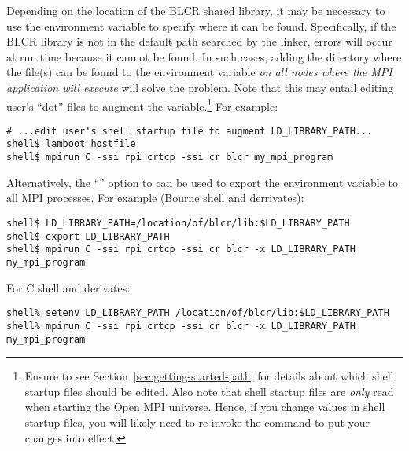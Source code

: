 
Depending on the location of the BLCR shared library, it may be
necessary to use the  environment
variable to specify where it can be found.  Specifically, if the BLCR
library is not in the default path searched by the linker, errors will
occur at run time because it cannot be found.  In such cases, adding
the directory where the  file(s) can be found to the
 environment variable {\em on all nodes
  where the MPI application will execute} will solve the problem.
%
Note that this may entail editing user's ``dot'' files to augment the
 variable.\footnote{Ensure to see
  Section~\ref{sec:getting-started-path} for details about which
  shell startup files should be edited.  Also note that 
  shell startup files are {\em only} read when starting the Open MPI
  universe.  Hence, if you change values in shell startup files, you
  will likely need to re-invoke the  command to put your
  changes into effect.}  For example:

\lstset{style=lam-cmdline}
\begin{lstlisting}
# ...edit user's shell startup file to augment LD_LIBRARY_PATH...
shell$ lamboot hostfile
shell$ mpirun C -ssi rpi crtcp -ssi cr blcr my_mpi_program
\end{lstlisting}

Alternatively, the ``'' option to  can be used to
export the  environment variable to all
MPI processes.  For example (Bourne shell and derrivates):

\lstset{style=lam-cmdline}
\begin{lstlisting}
shell$ LD_LIBRARY_PATH=/location/of/blcr/lib:$LD_LIBRARY_PATH
shell$ export LD_LIBRARY_PATH
shell$ mpirun C -ssi rpi crtcp -ssi cr blcr -x LD_LIBRARY_PATH my_mpi_program
\end{lstlisting}

For C shell and derivates:

\lstset{style=lam-cmdline}
\begin{lstlisting}
shell% setenv LD_LIBRARY_PATH /location/of/blcr/lib:$LD_LIBRARY_PATH
shell% mpirun C -ssi rpi crtcp -ssi cr blcr -x LD_LIBRARY_PATH my_mpi_program
\end{lstlisting}


 
